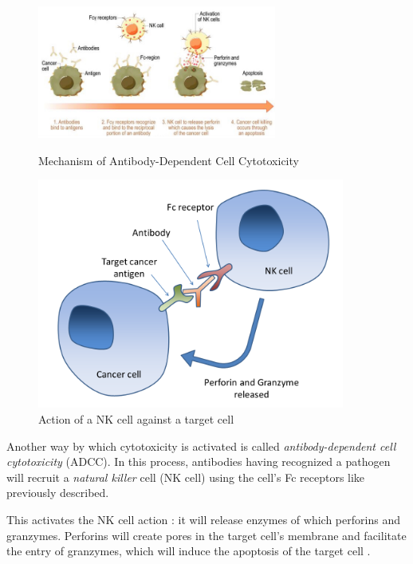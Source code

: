 \begin{figure}[H]
    \begin{minipage}{0.69\textwidth}
        \centering
        \includegraphics[width=0.7\textwidth]{../Images/ADCC.jpg}
        \caption{Mechanism of Antibody-Dependent Cell Cytotoxicity}
        \label{fig:ADCC}
    \end{minipage}\hfill
    \begin{minipage}{0.39\textwidth}
        \centering
        \includegraphics[width=0.9\textwidth]{../Images/Antibody-dependent_cell-mediated_cytotoxicity.png}   
        \caption{Action of a NK cell against a target cell}
        \label{fig:ADCC-NKcell}
    \end{minipage}
\end{figure}

Another way by which cytotoxicity is activated is called 
\emph{antibody-dependent cell cytotoxicity} (ADCC). In this process,
antibodies having recognized a pathogen will recruit a 
\emph{natural killer} cell (NK cell) using the cell's Fc receptors
like previously described.

This activates the NK cell action : it will release enzymes of which perforins
and granzymes. Perforins will create pores in the target cell's membrane and 
facilitate the entry of granzymes, which will induce the apoptosis
of the target cell \cite{paul_molecular_2017}.


